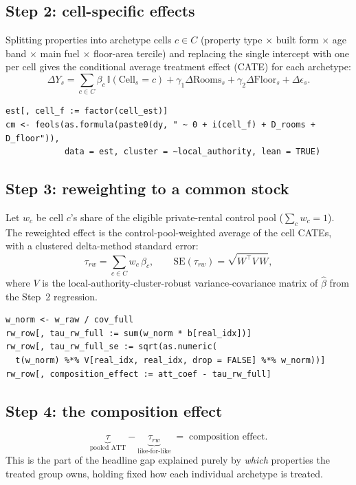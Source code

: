 \documentclass[11pt]{article}
\begin{document}
\subsection{Step 2: cell-specific effects}
Splitting properties into archetype cells $c \in C$ (property type $\times$ built
form $\times$ age band $\times$ main fuel $\times$ floor-area tercile) and replacing
the single intercept with one per cell gives the conditional average treatment
effect (CATE) for each archetype:
\begin{equation}
  \Delta Y_s = \sum_{c\in C}\beta_c\,\mathbb{I}(\mathrm{Cell}_s=c)
             + \gamma_1 \Delta \mathrm{Rooms}_s
             + \gamma_2 \Delta \mathrm{Floor}_s + \Delta\epsilon_s .
\end{equation}
\begin{lstlisting}
est[, cell_f := factor(cell_est)]
cm <- feols(as.formula(paste0(dy, " ~ 0 + i(cell_f) + D_rooms + D_floor")),
            data = est, cluster = ~local_authority, lean = TRUE)
\end{lstlisting}

\subsection{Step 3: reweighting to a common stock}
Let $w_c$ be cell $c$'s share of the eligible private-rental control pool
($\sum_c w_c = 1$). The reweighted effect is the control-pool-weighted average of the
cell CATEs, with a clustered delta-method standard error:
\begin{equation}
  \tau_{rw} = \sum_{c\in C} w_c\,\beta_c ,
  \qquad
  \mathrm{SE}(\tau_{rw}) = \sqrt{W^{\!\top} V\, W},
\end{equation}
where $V$ is the local-authority-cluster-robust variance-covariance matrix of
$\hat\beta$ from the Step~2 regression.
\begin{lstlisting}
w_norm <- w_raw / cov_full
rw_row[, tau_rw_full := sum(w_norm * b[real_idx])]
rw_row[, tau_rw_full_se := sqrt(as.numeric(
  t(w_norm) %*% V[real_idx, real_idx, drop = FALSE] %*% w_norm))]
rw_row[, composition_effect := att_coef - tau_rw_full]
\end{lstlisting}

\subsection{Step 4: the composition effect}
\begin{equation}
  \underbrace{\tau}_{\text{pooled ATT}} - \underbrace{\tau_{rw}}_{\text{like-for-like}}
  \;=\; \text{composition effect}.
\end{equation}
This is the part of the headline gap explained purely by \emph{which} properties the
treated group owns, holding fixed how each individual archetype is treated.
\end{document}
